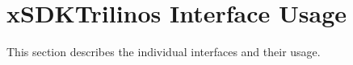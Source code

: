 \chapter{xSDKTrilinos Interface Usage}
This section describes the individual interfaces and their usage.





 